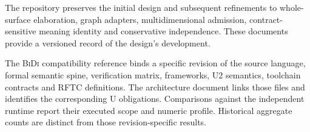 \documentclass[11pt]{article}
\theoremstyle{remark}
\newcommand{\bidi}{\textsc{BiDi}}
\begin{document}
The repository preserves the initial design and subsequent refinements to
whole-surface elaboration, graph adapters, multidimensional admission,
contract-sensitive meaning identity and conservative independence. These
documents provide a versioned record of the design's development.

The \bidi{} compatibility reference binds a specific revision of the source
language, formal semantic spine, verification matrix, frameworks, U2
semantics, toolchain contracts and RFTC definitions. The architecture
document links those files and identifies the corresponding U obligations.
Comparisons against the independent runtime report their executed scope and
numeric profile. Historical aggregate counts are distinct from those
revision-specific results.



\end{document}
